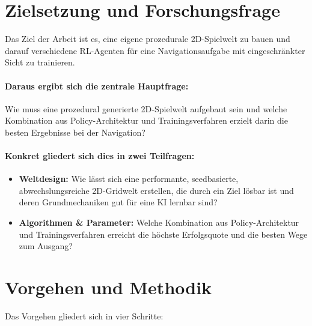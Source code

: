 \documentclass[
  a4paper,
  11pt,
  twoside,
  BCOR=8mm,           %
  headings=big,
  numbers=noenddot,
  listof=totoc,       %
  captions=tableheading,
]{scrreprt}
\begin{document}
\section{Zielsetzung und Forschungsfrage}
\label{sec:zielsetzung}

Das Ziel der Arbeit ist es, eine eigene prozedurale 2D-Spielwelt zu bauen und darauf verschiedene RL-Agenten für eine Navigationsaufgabe mit eingeschränkter Sicht zu trainieren.

\paragraph{Daraus ergibt sich die zentrale Hauptfrage:}
Wie muss eine prozedural generierte 2D-Spielwelt aufgebaut sein und welche Kombination aus Policy-Architektur und Trainingsverfahren erzielt darin die besten Ergebnisse bei der Navigation?

\paragraph{Konkret gliedert sich dies in zwei Teilfragen:}

\begin{itemize}
    \item \textbf{Weltdesign:} Wie lässt sich eine performante, seedbasierte, abwechslungsreiche 2D-Gridwelt erstellen, die durch ein Ziel lösbar ist und deren Grundmechaniken gut für eine KI lernbar sind?
    \item \textbf{Algorithmen \& Parameter:} Welche Kombination aus Policy-Architektur und Trainingsverfahren erreicht die höchste Erfolgsquote und die besten Wege zum Ausgang?
\end{itemize}

\section{Vorgehen und Methodik}
\label{sec:vorgehen}

Das Vorgehen gliedert sich in vier Schritte:
\end{document}
